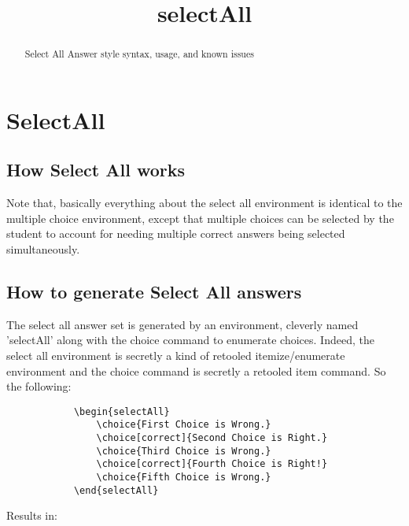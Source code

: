 \documentclass{ximera}
\title{selectAll}
\begin{document}
\begin{abstract}
    Select All Answer style syntax, usage, and known issues 
\end{abstract}
\maketitle

\section*{SelectAll}
    \subsection*{How Select All works}
    
        Note that, basically everything about the select all environment is identical to the multiple choice environment, except that multiple choices can be selected by the student to account for needing multiple correct answers being selected simultaneously.
    
    \subsection*{How to generate Select All answers}
    
        The select all answer set is generated by an environment, cleverly named 'selectAll' along with the choice command to enumerate choices. Indeed, the select all environment is secretly a kind of retooled itemize/enumerate environment and the choice command is secretly a retooled item command. So the following:
        \begin{verbatim}
            \begin{selectAll}
                \choice{First Choice is Wrong.}
                \choice[correct]{Second Choice is Right.}
                \choice{Third Choice is Wrong.}
                \choice[correct]{Fourth Choice is Right!}
                \choice{Fifth Choice is Wrong.}
            \end{selectAll}
        \end{verbatim}
        Results in:
        \begin{selectAll}
        \end{selectAll}
        
\end{document}
